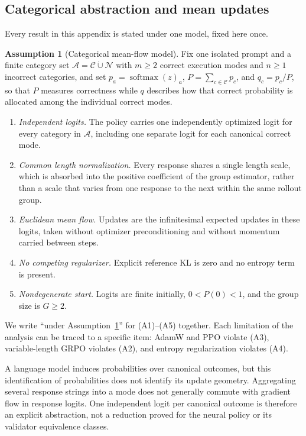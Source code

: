 \documentclass{article}
\newcommand{\1}{\mathbf 1}
\theoremstyle{remark}
\theoremstyle{definition}
\newtheorem{assumption}[lemma]{Assumption}
\theoremstyle{plain}
\begin{document}
\subsection{Categorical abstraction and mean updates}
\label{app:theory-grpo-mean}

Every result in this appendix is stated under one model, fixed here once.

\begin{assumption}[Categorical mean-flow model]
\label{ass:categorical-mean-flow}
Fix one isolated prompt and a finite category set
$\mathcal A=\mathcal C\mathbin{\dot\cup}\mathcal N$ with $m\ge2$ correct
execution modes and $n\ge1$ incorrect categories, and set
$p_a=\operatorname{softmax}(z)_a$, $P=\sum_{c\in\mathcal C}p_c$, and
$q_c=p_c/P$, so that $P$ measures correctness while $q$ describes how that
correct probability is allocated among the individual correct modes.
\begin{enumerate}
\item[(A1)] \emph{Independent logits.} The policy carries one independently
  optimized logit for every category in $\mathcal A$, including one separate
  logit for each canonical correct mode.
\item[(A2)] \emph{Common length normalization.} Every response shares a single
  length scale, which is absorbed into the positive coefficient of the group
  estimator, rather than a scale that varies from one response to the next
  within the same rollout group.
\item[(A3)] \emph{Euclidean mean flow.} Updates are the infinitesimal expected
  updates in these logits, taken without optimizer preconditioning and without
  momentum carried between steps.
\item[(A4)] \emph{No competing regularizer.} Explicit reference KL is zero and
  no entropy term is present.
\item[(A5)] \emph{Nondegenerate start.} Logits are finite initially,
  $0<P(0)<1$, and the group size is $G\ge2$.
\end{enumerate}
\end{assumption}

We write ``under Assumption~\ref{ass:categorical-mean-flow}'' for (A1)--(A5)
together. Each limitation of the analysis can be traced to a specific item:
AdamW and PPO violate (A3), variable-length GRPO violates (A2), and entropy
regularization violates (A4).

A language model induces probabilities over canonical outcomes, but this
identification of probabilities does not identify its update geometry.
Aggregating several response strings into a mode does not generally commute
with gradient flow in response logits. One independent logit per canonical
outcome is therefore an explicit abstraction, not a reduction proved for the
neural policy or its validator equivalence classes.
\end{document}
